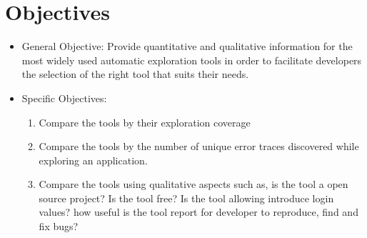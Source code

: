 \section{Objectives}
\label{sec:objectives}
\begin{itemize}
	\item General Objective:
		Provide quantitative and qualitative information for the most widely used automatic exploration tools in order to facilitate developers the selection of the right tool that suits their needs.
		
	\item Specific Objectives:
		\begin{enumerate}
			\item Compare the tools by their exploration coverage 
			\item Compare the tools by the number of unique error traces discovered while exploring an application.
			\item Compare the tools using qualitative aspects such as, is the tool a open source project? Is the tool free? Is the tool allowing introduce login values? how useful is the tool report for developer to reproduce, find and fix bugs?
		\end{enumerate}
\end{itemize}
